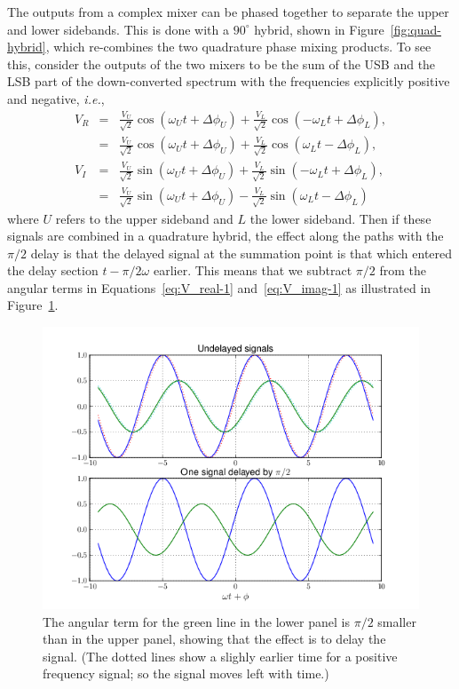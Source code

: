 \documentclass[letterpaper,11pt]{book}
\begin{document}
The outputs from a complex mixer can be phased together to separate
the upper and lower sidebands.  This is done with a $90^{\circ}$ hybrid,
shown in Figure~\ref{fig:quad-hybrid},
which re-combines the two quadrature phase mixing products.
To see this, consider the outputs of the two mixers to be the sum of
the USB and the LSB part of the down-converted spectrum with the
frequencies explicitly positive and negative,
{\itshape i.e.},
\begin{eqnarray}
V_R &=&   \frac{V_{U}}{\sqrt{2}} \cos( \omega_{U} t + \Delta \phi_{U})
        + \frac{V_{L}}{\sqrt{2}} \cos(-\omega_{L} t + \Delta \phi_{L}),
          \label{eq:V_real-1} \\
    &=&   \frac{V_{U}}{\sqrt{2}} \cos(\omega_{U} t + \Delta \phi_{U})
        + \frac{V_{L}}{\sqrt{2}} \cos(\omega_{L} t - \Delta \phi_{L}),
          \label{eq:V_real-2} \\
V_I &=&   \frac{V_{U}}{\sqrt{2}} \sin( \omega_{U} t + \Delta \phi_{U})
        + \frac{V_{L}}{\sqrt{2}} \sin(-\omega_{L} t + \Delta \phi_{L}),
          \label{eq:V_imag-1} \\
    &=&   \frac{V_{U}}{\sqrt{2}} \sin(\omega_{U} t + \Delta \phi_{U})
        - \frac{V_{L}}{\sqrt{2}} \sin(\omega_{L} t - \Delta \phi_{L})
      \label{eq:V_imag-2}
\end{eqnarray}
where $U$ refers to the upper sideband and $L$ the lower sideband.
Then if these signals are combined in a quadrature hybrid, the effect
along the paths with the $\pi/2$ delay is that the delayed signal at
the summation point is that which entered the delay section $t - \pi/2\omega$
earlier.  This means that we subtract $\pi/2$ from the angular terms in 
Equations~\ref{eq:V_real-1} and~\ref{eq:V_imag-1} as illustrated
in Figure~\ref{fig:phase-delay}.
\begin{figure}[h!tb]
\begin{center}
\includegraphics[width=5in]{hybrid-delay.png}
\caption[Phase delay]{\label{fig:phase-delay}The angular term for the green line
in the lower panel is $\pi/2$ smaller than in the upper panel, showing that the
effect is to delay the signal. (The dotted
lines show a slighly earlier time for a positive frequency signal; so
the signal moves left with time.)}
\end{center}
\end{figure}
\end{document}
